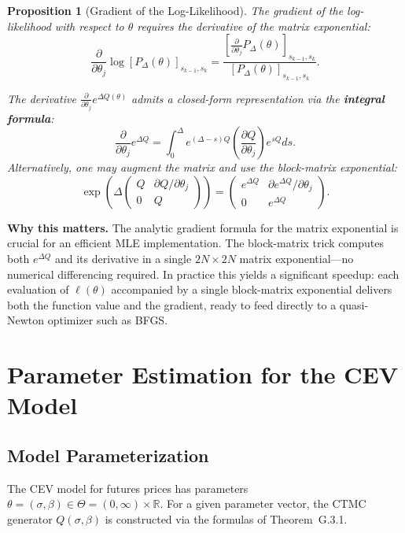 \documentclass[11pt,a4paper,openany]{book}
\theoremstyle{definition}
\theoremstyle{plain}
\newtheorem{proposition}[theorem]{Proposition}
\theoremstyle{remark}
\newcommand{\1}{\mathbbm{1}}
\newcommand{\R}{\mathbb{R}}
\begin{document}
\begin{proposition}[Gradient of the Log-Likelihood]
The gradient of the log-likelihood with respect to $\theta$ requires the derivative of the matrix exponential:
\[
\frac{\partial}{\partial \theta_{j}} \log [P_{\Delta}(\theta)]_{s_{k-1}, s_{k}} = \frac{[\frac{\partial}{\partial \theta_{j}} P_{\Delta}(\theta)]_{s_{k-1}, s_{k}}}{[P_{\Delta}(\theta)]_{s_{k-1}, s_{k}}}.
\]

The derivative $\frac{\partial}{\partial \theta_{j}} e^{\Delta Q(\theta)}$ admits a closed-form representation via the \textbf{integral formula}:
\[
\frac{\partial}{\partial \theta_{j}} e^{\Delta Q} = \int_{0}^{\Delta} e^{(\Delta - s) Q} \left(\frac{\partial Q}{\partial \theta_{j}}\right) e^{s Q} ds.
\]
Alternatively, one may augment the matrix and use the block-matrix exponential:
\[
\exp\left( \Delta \begin{pmatrix} Q & \partial Q/\partial \theta_{j} \\ 0 & Q \end{pmatrix} \right) = \begin{pmatrix} e^{\Delta Q} & \partial e^{\Delta Q} / \partial \theta_{j} \\ 0 & e^{\Delta Q} \end{pmatrix}.
\]
\end{proposition}

\medskip
\noindent\textbf{Why this matters.} The analytic gradient formula for the matrix exponential is crucial for an efficient MLE implementation. The block-matrix trick computes both $e^{\Delta Q}$ and its derivative in a single $2N \times 2N$ matrix exponential---no numerical differencing required. In practice this yields a significant speedup: each evaluation of $\ell(\theta)$ accompanied by a single block-matrix exponential delivers both the function value and the gradient, ready to feed directly to a quasi-Newton optimizer such as BFGS.

\chapter{Parameter Estimation for the CEV Model}

\section{Model Parameterization}

The CEV model for futures prices has parameters $\theta = (\sigma, \beta) \in \Theta = (0, \infty) \times \R$. For a given parameter vector, the CTMC generator $Q(\sigma, \beta)$ is constructed via the formulas of Theorem~G.3.1.
\end{document}
